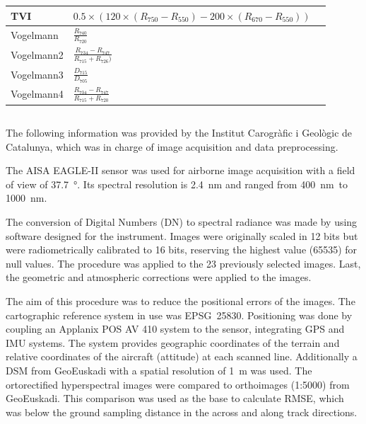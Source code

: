\documentclass[remotesensing,article,submit,moreauthors,pdftex]{Definitions/mdpi}
\begin{document}
{\begin{supertabular}{lll}
		\midrule
		TVI             & \parbox{3.8cm}{$0.5\times (120 \times (R_{750}-R_{550})-200 \times (R_{670}-R_{550}))$}              & \cite{broge2001}              \\
		\midrule
		Vogelmann       & $\frac{R_{740}}{R_{720}}$                                                                            & \cite{vogelmann1993}          \\
		Vogelmann2      & $\frac{R_{734}-R_{747}}{R_{715}+R_{726})}$                                                           & \cite{vogelmann1993}          \\
		Vogelmann3      & $\frac{D_{715}}{D_{705}}$                                                                            & \cite{vogelmann1993}          \\
		Vogelmann4      & $\frac{R_{734}-R_{747}}{R_{715}+R_{720}}$                                                            & \cite{vogelmann1993}     \\
	\end{supertabular}
	\label{tab:vegindices}
}

\pagebreak

\subsection{}

The following information was provided by the Institut Carogràfic i Geològic de Catalunya, which was in charge of image acquisition and data preprocessing.

The AISA EAGLE-II sensor was used for airborne image acquisition with a field of view of 37.7~°.
Its spectral resolution is 2.4~nm and ranged from 400~nm\ to 1000~nm.

The conversion of Digital Numbers (DN) to spectral radiance was made by using software designed for the instrument.
Images were originally scaled in 12 bits but were radiometrically calibrated to 16 bits, reserving the highest value (65535) for null values.
The procedure was applied to the 23 previously selected images.
Last, the geometric and atmospheric corrections were applied to the images.

The aim of this procedure was to reduce the positional errors of the images.
The cartographic reference system in use was EPSG~25830.
Positioning was done by coupling an Applanix POS AV 410 system to the sensor, integrating GPS and IMU systems.
The system provides geographic coordinates of the terrain and relative coordinates of the aircraft (attitude) at each scanned line.
Additionally a DSM from GeoEuskadi with a spatial resolution of 1~m was used.
The ortorectified hyperspectral images were compared to orthoimages (1:5000) from GeoEuskadi.
This comparison was used as the base to calculate RMSE, which was below the ground sampling distance in the across and along track directions.
\end{document}
